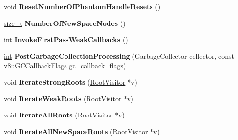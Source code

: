\begin{DoxyCompactItemize}
\mbox{\label{classv8_1_1internal_1_1GlobalHandles_ac891251a51b6aacb26e1b3ff9908f4d0}} 
void {\bfseries Reset\+Number\+Of\+Phantom\+Handle\+Resets} ()
\item 
\mbox{\label{classv8_1_1internal_1_1GlobalHandles_a38299b5bc78072ae350ff8d84ea087e5}} 
\mbox{\hyperlink{classsize__t}{size\+\_\+t}} {\bfseries Number\+Of\+New\+Space\+Nodes} ()
\item 
\mbox{\label{classv8_1_1internal_1_1GlobalHandles_acb854a3689cc8e8bec2179101bbe6e58}} 
\mbox{\hyperlink{classint}{int}} {\bfseries Invoke\+First\+Pass\+Weak\+Callbacks} ()
\item 
\mbox{\label{classv8_1_1internal_1_1GlobalHandles_a7191d3b6218e05993443fbd7ad5908c6}} 
\mbox{\hyperlink{classint}{int}} {\bfseries Post\+Garbage\+Collection\+Processing} (Garbage\+Collector collector, const v8\+::\+G\+C\+Callback\+Flags gc\+\_\+callback\+\_\+flags)
\item 
\mbox{\label{classv8_1_1internal_1_1GlobalHandles_abeb34b96e383b1b66f554f972eaa67e5}} 
void {\bfseries Iterate\+Strong\+Roots} (\mbox{\hyperlink{classv8_1_1internal_1_1RootVisitor}{Root\+Visitor}} $\ast$v)
\item 
\mbox{\label{classv8_1_1internal_1_1GlobalHandles_ae36970816b69a4ba3b4eebef5fd861e9}} 
void {\bfseries Iterate\+Weak\+Roots} (\mbox{\hyperlink{classv8_1_1internal_1_1RootVisitor}{Root\+Visitor}} $\ast$v)
\item 
\mbox{\label{classv8_1_1internal_1_1GlobalHandles_a876786cdf78faecb4f8ecf02c76c255b}} 
void {\bfseries Iterate\+All\+Roots} (\mbox{\hyperlink{classv8_1_1internal_1_1RootVisitor}{Root\+Visitor}} $\ast$v)
\item 
\mbox{\label{classv8_1_1internal_1_1GlobalHandles_ac4c65dee7d1193385a48c7dfda668448}} 
void {\bfseries Iterate\+All\+New\+Space\+Roots} (\mbox{\hyperlink{classv8_1_1internal_1_1RootVisitor}{Root\+Visitor}} $\ast$v)
\item 

\end{DoxyCompactItemize}
